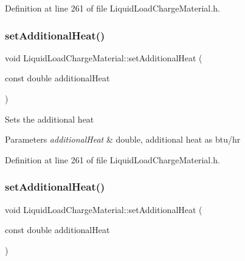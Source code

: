 Definition at line 261 of file Liquid\+Load\+Charge\+Material.\+h.

\mbox{\label{class_liquid_load_charge_material_a557c1f588cfb972ff0c7f748d6c2bd8f}} 
\subsubsection{\texorpdfstring{set\+Additional\+Heat()}{setAdditionalHeat()}\hspace{0.1cm}{\footnotesize\ttfamily [2/3]}}
{\footnotesize\ttfamily void Liquid\+Load\+Charge\+Material\+::set\+Additional\+Heat (\begin{DoxyParamCaption}\item[{const double}]{additional\+Heat }\end{DoxyParamCaption})\hspace{0.3cm}{\ttfamily [inline]}}

Sets the additional heat 
\begin{DoxyParams}{Parameters}
{\em additional\+Heat} & double, additional heat as btu/hr \\
\hline
\end{DoxyParams}


Definition at line 261 of file Liquid\+Load\+Charge\+Material.\+h.

\mbox{\label{class_liquid_load_charge_material_a557c1f588cfb972ff0c7f748d6c2bd8f}} 
\subsubsection{\texorpdfstring{set\+Additional\+Heat()}{setAdditionalHeat()}\hspace{0.1cm}{\footnotesize\ttfamily [3/3]}}
{\footnotesize\ttfamily void Liquid\+Load\+Charge\+Material\+::set\+Additional\+Heat (\begin{DoxyParamCaption}\item[{const double}]{additional\+Heat }\end{DoxyParamCaption})\hspace{0.3cm}{\ttfamily [inline]}}

